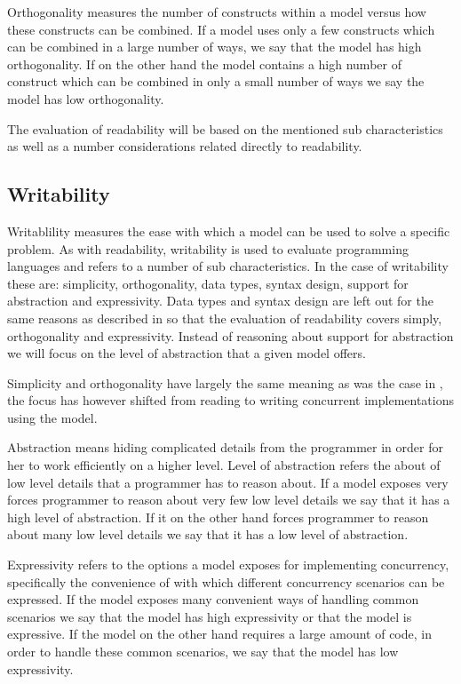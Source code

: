 Orthogonality measures the number of constructs within a model versus how these constructs can be combined\cite[p. 9]{sebestaProLang}. If a model uses only a few constructs which can be combined in a large number of ways, we say that the model has high orthogonality. If on the other hand the model contains a high number of construct which can be combined in only a small number of ways we say the model has low orthogonality.

The evaluation of readability will be based on the mentioned sub characteristics as well as a number considerations related directly to readability.

\subsection{Writability}\label{sec:writablity}
Writablility measures the ease with which a model can be used to solve a specific problem\cite[p. 13]{sebestaProLang}. As with readability, writability is used to evaluate programming languages and refers to a number of sub characteristics. In the case of writability these are: simplicity, orthogonality, data types, syntax design, support for abstraction and expressivity. Data types and syntax design are left out for the same reasons as described in  so that the evaluation of readability  covers simply, orthogonality and expressivity. Instead of reasoning about support for abstraction we will focus on the level of abstraction that a given model offers.

Simplicity and orthogonality have largely the same meaning as was the case in , the focus has however shifted from reading to writing concurrent implementations using the model. 

Abstraction means hiding complicated details from the programmer in order for her to work efficiently on a higher level\cite[p. 14]{sebestaProLang}. Level of abstraction refers the about of low level details that a programmer has to reason about. If a model exposes very forces programmer to reason about very few low level details we say that it has a high level of abstraction. If it on the other hand forces programmer to reason about many low level details we say that it has a low level of abstraction.

Expressivity refers to the options a model exposes for implementing concurrency, specifically the convenience of with which different concurrency scenarios can be expressed. If the model exposes many convenient ways of handling common scenarios we say that the model has high expressivity or that the model is expressive. If the model on the other hand requires a large amount of code, in order to handle these common scenarios, we say that the model has low expressivity.

